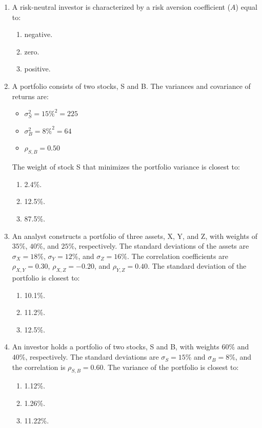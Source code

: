 \begin{enumerate}
	\item A risk-neutral investor is characterized by a risk aversion coefficient ($A$) equal to:
	      \begin{enumerate}[label=\Alph*.]
		      \item negative.
		      \item zero.
		      \item positive.
	      \end{enumerate}

	\item A portfolio consists of two stocks, S and B. The variances and covariance of returns are:
	      \begin{itemize}
		      \item $\sigma_S^2 = 15\%^2 = 225$
		      \item $\sigma_B^2 = 8\%^2 = 64$
		      \item $\rho_{S,B} = 0.50$
	      \end{itemize}
	      The weight of stock S that minimizes the portfolio variance is closest to:
	      \begin{enumerate}[label=\Alph*.]
		      \item 2.4\%.
		      \item 12.5\%.
		      \item 87.5\%.
	      \end{enumerate}

	\item An analyst constructs a portfolio of three assets, X, Y, and Z, with weights of $35\%$, $40\%$, and $25\%$, respectively. The standard deviations of the assets are $\sigma_X = 18\%$, $\sigma_Y = 12\%$, and $\sigma_Z = 16\%$. The correlation coefficients are $\rho_{X,Y} = 0.30$, $\rho_{X,Z} = -0.20$, and $\rho_{Y,Z} = 0.40$. The standard deviation of the portfolio is closest to:
	      \begin{enumerate}[label=\Alph*.]
		      \item 10.1\%.
		      \item 11.2\%.
		      \item 12.5\%.
	      \end{enumerate}

	\item An investor holds a portfolio of two stocks, S and B, with weights $60\%$ and $40\%$, respectively. The standard deviations are $\sigma_S = 15\%$ and $\sigma_B = 8\%$, and the correlation is $\rho_{S,B} = 0.60$. The variance of the portfolio is closest to:
	      \begin{enumerate}[label=\Alph*.]
		      \item 1.12\%.
		      \item 1.26\%.
		      \item 11.22\%.
	      \end{enumerate}


\end{enumerate}
